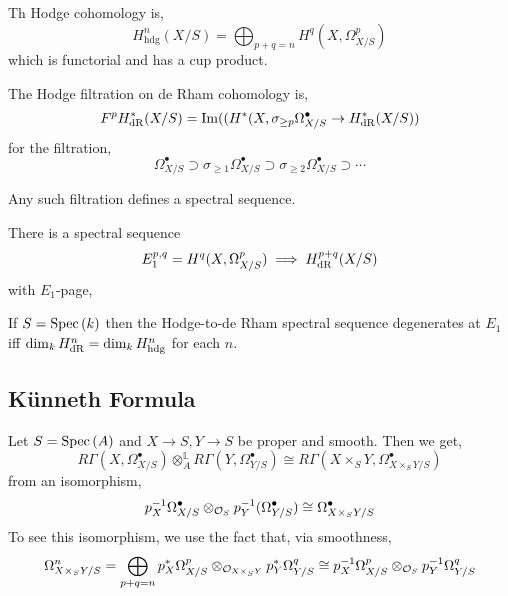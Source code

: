 \documentclass[12pt]{article}
\begin{document}
\begin{definition}
Th Hodge cohomology is,
\[ H^n_{\text{hdg}}(X / S) = \bigoplus_{p + q = n} H^q(X, \Omega^p_{X / S}) \]
which is functorial and has a cup product.
\end{definition}

\begin{definition}
The Hodge filtration on de Rham cohomology is,
\[ F^p H^*_{\mathrm{dR}}(X / S) = \mathrm{Im}((H^*(X, \sigma_{\ge p} \Omega^\bullet_{X / S} \to H^*_{\mathrm{dR}}(X / S)) \]
for the filtration,
\[ \Omega^\bullet_{X / S} \supset \sigma_{\ge 1} \Omega^\bullet_{X / S} \supset \sigma_{\ge 2} \Omega^\bullet_{X  / S} \supset \cdots \] 
\end{definition}

\begin{remark}
Any such filtration defines a spectral sequence.
\end{remark}

\begin{proposition}
There is a spectral sequence
\[ E^{p,q}_1 = H^q(X, \Omega^p_{X / S}) \implies H_{\mathrm{dR}}^{p + q}(X / S) \]
with $E_1$-page,
\begin{center}
\end{center}
\end{proposition}

\begin{proposition}
If $S = \mathrm{Spec}\left( k \right)$ then the Hodge-to-de Rham spectral sequence degenerates at $E_1$ iff $\dim_k H^n_{\mathrm{dR}} = \dim_k H^n_{\text{hdg}}$ for each $n$. 
\end{proposition}

\subsection{K\"{u}nneth Formula}

\begin{proposition}
Let $S = \mathrm{Spec}\left( A \right)$ and $X \to S, Y \to S$ be proper and smooth. Then we get,
\[ R \Gamma(X, \Omega^\bullet_{X / S}) \otimes_{A}^{\mathbb{L}} R\Gamma(Y, \Omega^\bullet_{Y / S}) \cong R\Gamma(X \times_S Y, \Omega^\bullet_{X \times_S Y / S}) \]
from an isomorphism,
\[ p_X^{-1} \Omega^\bullet_{X / S} \otimes_{\mathcal{O}_{S}} p_Y^{-1}(\Omega^\bullet_{Y / S}) \cong \Omega^\bullet_{X \times_S Y / S} \]
To see this isomorphism, we use the fact that, via smoothness,
\[ \Omega^n_{X \times_S Y / S} = \bigoplus_{p + q = n} p_X^* \Omega^p_{X / S} \otimes_{\mathcal{O}_{X \times_S Y}} p_Y^* \Omega^q_{Y / S} \cong p_X^{-1} \Omega^p_{X / S} \otimes_{\mathcal{O}_{S}} p_Y^{-1} \Omega^q_{Y / S} \]
\end{proposition}
\end{document}
